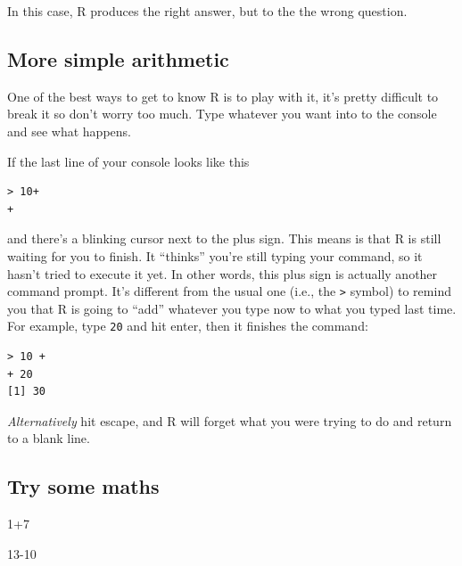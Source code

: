 \documentclass[
]{book}
\newenvironment{Shaded}{\begin{snugshade}}{\end{snugshade}}
\newcommand{\DecValTok}[1]{\textcolor[rgb]{0.00,0.00,0.81}{#1}}
\newcommand{\SpecialCharTok}[1]{\textcolor[rgb]{0.00,0.00,0.00}{#1}}
\begin{document}
In this case, R produces the right answer, but to the the wrong question.

\hypertarget{more-simple-arithmetic}{%
\subsection{More simple arithmetic}\label{more-simple-arithmetic}}

One of the best ways to get to know R is to play with it, it's pretty difficult to break it so don't worry too much. Type whatever you want into to the console and see what happens.

If the last line of your console looks like this

\begin{verbatim}
> 10+
+ 
\end{verbatim}

and there's a blinking cursor next to the plus sign. This means is that R is still waiting for you to finish. It ``thinks'' you're still typing your command, so it hasn't tried to execute it yet. In other words, this plus sign is actually another command prompt. It's different from the usual one (i.e., the \texttt{\textgreater{}} symbol) to remind you that R is going to ``add'' whatever you type now to what you typed last time. For example, type \texttt{20} and hit enter, then it finishes the command:

\begin{verbatim}
> 10 +
+ 20
[1] 30
\end{verbatim}

\emph{Alternatively} hit escape, and R will forget what you were trying to do and return to a blank line.

\hypertarget{try-some-maths}{%
\subsection{Try some maths}\label{try-some-maths}}

\begin{Shaded}
\begin{Highlighting}[]
\DecValTok{1}\SpecialCharTok{+}\DecValTok{7}
\end{Highlighting}
\end{Shaded}

\begin{Shaded}
\begin{Highlighting}[]
\DecValTok{13{-}10}
\end{Highlighting}
\end{Shaded}
\end{document}
